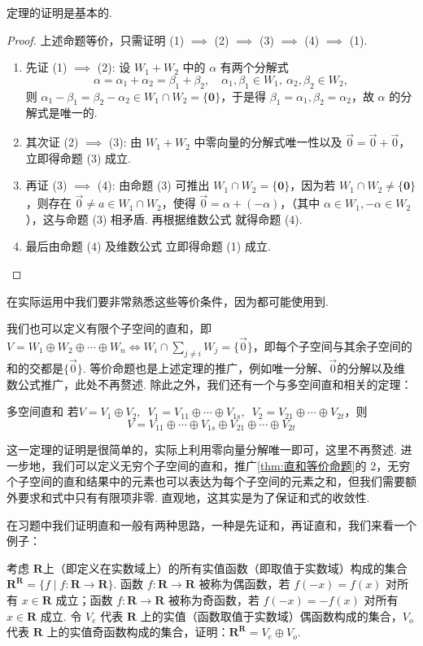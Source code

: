 定理的证明是基本的.
\begin{proof}
    上述命题等价，只需证明 (1) $\implies$ (2) $\implies$ (3) $\implies$ (4) $\implies$ (1).
    \begin{enumerate}
        \item 先证 (1) $\implies$ (2): 设 $W_1 + W_2$ 中的 $\alpha$ 有两个分解式
        $$
        \alpha = \alpha_1 + \alpha_2 = \beta_1 + \beta_2, \quad \alpha_1, \beta_1 \in W_1, \ \alpha_2, \beta_2 \in W_2,
        $$
        则 $\alpha_1 - \beta_1 = \beta_2 - \alpha_2 \in W_1 \cap W_2 = \{\mathbf{0}\}$，于是得 $\beta_1 = \alpha_1, \beta_2 = \alpha_2$，故 $\alpha$ 的分解式是唯一的.
        \item 其次证 (2) $\implies$ (3): 由 $W_1 + W_2$ 中零向量的分解式唯一性以及 $\vec{0} = \vec{0} + \vec{0}$，立即得命题 (3) 成立.
        \item 再证 (3) $\implies$ (4): 由命题 (3) 可推出 $W_1 \cap W_2 = \{\mathbf{0}\}$，因为若 $W_1 \cap W_2 \ne \{\mathbf{0}\}$，则存在 $\vec{0} \ne a \in W_1 \cap W_2$，使得 $\vec{0} = \alpha + (-\alpha)$，（其中 $\alpha \in W_1, -\alpha \in W_2$），这与命题 (3) 相矛盾. 再根据维数公式 就得命题 (4).
        \item 最后由命题 (4) 及维数公式 立即得命题 (1) 成立.
    \end{enumerate}
\end{proof}
在实际运用中我们要非常熟悉这些等价条件，因为都可能使用到.

我们也可以定义有限个子空间的直和，即$V=W_1\oplus W_2\oplus\cdots\oplus W_n \iff W_i \cap \sum\limits_{j \neq i}W_j=\{\vec{0}\}$，即每个子空间与其余子空间的和的交都是$\{\vec{0}\}$. 等价命题也是上述定理的推广，例如唯一分解、$\vec{0}$的分解以及维数公式推广，此处不再赘述. 除此之外，我们还有一个与多空间直和相关的定理：
\begin{theorem}{}{多空间直和}
    若$V=V_1\oplus V_2,\enspace V_1=V_{11}\oplus\cdots\oplus V_{1s},\enspace V_2=V_{21}\oplus\cdots\oplus V_{2t}$，则
    \[V=V_{11}\oplus\cdots\oplus V_{1s}\oplus V_{21}\oplus\cdots\oplus V_{2t}\]
\end{theorem}
这一定理的证明是很简单的，实际上利用零向量分解唯一即可，这里不再赘述. 进一步地，我们可以定义无穷个子空间的直和，推广\autoref{thm:直和等价命题}的 $2$，无穷个子空间的直和结果中的元素也可以表达为每个子空间的元素之和，但我们需要额外要求和式中只有有限项非零. 直观地，这其实是为了保证和式的收敛性.

在习题中我们证明直和一般有两种思路，一种是先证和，再证直和，我们来看一个例子：
\begin{example}{}{}
    考虑 $\mathbf{R}$上（即定义在实数域上）的所有实值函数（即取值于实数域）构成的集合 $\mathbf{R}^\mathbf{R} = \{f \mid f: \mathbf{R} \to \mathbf{R}\}$.  函数 $f: \mathbf{R} \to \mathbf{R}$ 被称为偶函数，若 $f(-x) = f(x)$ 对所有 $x \in \mathbf{R}$ 成立；函数 $f: \mathbf{R} \to \mathbf{R}$ 被称为奇函数，若 $f(-x) = -f(x)$ 对所有 $x \in \mathbf{R}$ 成立. 令 $V_e$ 代表 $\mathbf{R}$ 上的实值（函数取值于实数域）偶函数构成的集合，$V_o$ 代表 $\mathbf{R}$ 上的实值奇函数构成的集合，证明：$\mathbf{R}^\mathbf{R} = V_e \oplus V_o$.
\end{example}

